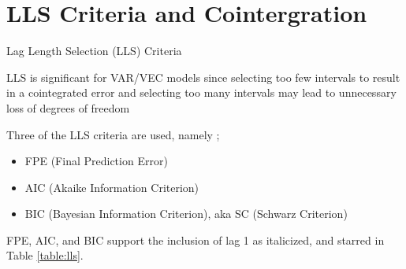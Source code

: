 \documentclass{beamer}
\begin{document}
	
	\section{LLS Criteria and Cointergration}
	\begin{frame}{Lag Length Selection (LLS) Criteria}
		\begin{block}{}
			LLS is significant for VAR/VEC models since selecting too few intervals to result in a cointegrated error and selecting too many intervals may lead to unnecessary loss of degrees of freedom
		\end{block}
	
		\begin{exampleblock}{Three of the LLS criteria are used, namely ;}
			\begin{itemize}
				\item FPE (Final Prediction Error)
				\item AIC (Akaike Information Criterion)
				\item BIC (Bayesian Information Criterion), aka SC (Schwarz Criterion)
			\end{itemize} 
		\end{exampleblock}
		
		
		\begin{block}{}
			FPE, AIC, and BIC support the inclusion of lag 1 as italicized, and starred in Table \ref{table:lls}. 
		\end{block}
	\end{frame}
\end{document}
